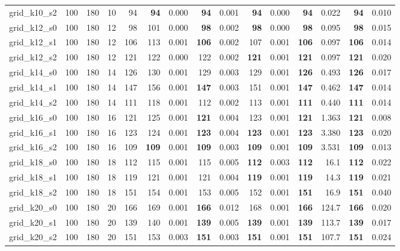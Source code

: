 \begin{longtable}{@{}lrrrr@{\hspace{9pt}}rr@{\hspace{9pt}}rr@{\hspace{9pt}}rr@{\hspace{9pt}}rr@{\hspace{9pt}}rr@{}}
grid\_k10\_s2 & 100 & 180 & 10 & 94 & \textbf{94} & 0.000 & \textbf{94} & 0.001 & \textbf{94} & 0.000 & \textbf{94} & 0.022 & \textbf{94} & 0.010\\
grid\_k12\_s0 & 100 & 180 & 12 & 98 & 101 & 0.000 & \textbf{98} & 0.002 & \textbf{98} & 0.000 & \textbf{98} & 0.095 & \textbf{98} & 0.015\\
grid\_k12\_s1 & 100 & 180 & 12 & 106 & 113 & 0.001 & \textbf{106} & 0.002 & 107 & 0.001 & \textbf{106} & 0.097 & \textbf{106} & 0.014\\
grid\_k12\_s2 & 100 & 180 & 12 & 121 & 122 & 0.000 & 122 & 0.002 & \textbf{121} & 0.001 & \textbf{121} & 0.097 & \textbf{121} & 0.020\\
grid\_k14\_s0 & 100 & 180 & 14 & 126 & 130 & 0.001 & 129 & 0.003 & 129 & 0.001 & \textbf{126} & 0.493 & \textbf{126} & 0.017\\
grid\_k14\_s1 & 100 & 180 & 14 & 147 & 156 & 0.001 & \textbf{147} & 0.003 & 151 & 0.001 & \textbf{147} & 0.462 & \textbf{147} & 0.014\\
grid\_k14\_s2 & 100 & 180 & 14 & 111 & 118 & 0.001 & 112 & 0.002 & 113 & 0.001 & \textbf{111} & 0.440 & \textbf{111} & 0.014\\
grid\_k16\_s0 & 100 & 180 & 16 & 121 & 125 & 0.001 & \textbf{121} & 0.004 & 123 & 0.001 & \textbf{121} & 1.363 & \textbf{121} & 0.008\\
grid\_k16\_s1 & 100 & 180 & 16 & 123 & 124 & 0.001 & \textbf{123} & 0.004 & \textbf{123} & 0.001 & \textbf{123} & 3.380 & \textbf{123} & 0.020\\
grid\_k16\_s2 & 100 & 180 & 16 & 109 & \textbf{109} & 0.001 & \textbf{109} & 0.003 & \textbf{109} & 0.001 & \textbf{109} & 3.531 & \textbf{109} & 0.013\\
grid\_k18\_s0 & 100 & 180 & 18 & 112 & 115 & 0.001 & 115 & 0.005 & \textbf{112} & 0.003 & \textbf{112} & 16.1 & \textbf{112} & 0.022\\
grid\_k18\_s1 & 100 & 180 & 18 & 119 & 121 & 0.001 & 121 & 0.004 & \textbf{119} & 0.001 & \textbf{119} & 14.3 & \textbf{119} & 0.021\\
grid\_k18\_s2 & 100 & 180 & 18 & 151 & 154 & 0.001 & 153 & 0.005 & 152 & 0.001 & \textbf{151} & 16.9 & \textbf{151} & 0.040\\
grid\_k20\_s0 & 100 & 180 & 20 & 166 & 169 & 0.001 & \textbf{166} & 0.012 & 168 & 0.001 & \textbf{166} & 124.7 & \textbf{166} & 0.020\\
grid\_k20\_s1 & 100 & 180 & 20 & 139 & 140 & 0.001 & \textbf{139} & 0.005 & \textbf{139} & 0.001 & \textbf{139} & 113.7 & \textbf{139} & 0.017\\
grid\_k20\_s2 & 100 & 180 & 20 & 151 & 153 & 0.003 & \textbf{151} & 0.003 & \textbf{151} & 0.001 & \textbf{151} & 107.7 & \textbf{151} & 0.024\\
\bottomrule\end{longtable}\endgroup
